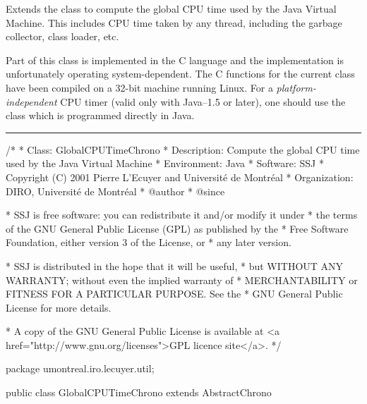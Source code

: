 
Extends the   class to compute the global CPU time used
by the Java Virtual Machine. This includes CPU time taken by any thread,
including the garbage collector, class loader, etc.

Part of this class is implemented in the C language and the 
implementation is unfortunately operating system-dependent.
The C functions for the current class have been compiled on a 32-bit machine
running Linux. %
For a {\em platform-independent} CPU timer (valid only with Java--1.5 or later),
 one should use the class  which is programmed 
directly in Java.

\bigskip\hrule
\begin{code}
\begin{hide}
/*
 * Class:        GlobalCPUTimeChrono
 * Description:  Compute the global CPU time used by the Java Virtual Machine
 * Environment:  Java
 * Software:     SSJ 
 * Copyright (C) 2001  Pierre L'Ecuyer and Université de Montréal
 * Organization: DIRO, Université de Montréal
 * @author       
 * @since

 * SSJ is free software: you can redistribute it and/or modify it under
 * the terms of the GNU General Public License (GPL) as published by the
 * Free Software Foundation, either version 3 of the License, or
 * any later version.

 * SSJ is distributed in the hope that it will be useful,
 * but WITHOUT ANY WARRANTY; without even the implied warranty of
 * MERCHANTABILITY or FITNESS FOR A PARTICULAR PURPOSE.  See the
 * GNU General Public License for more details.

 * A copy of the GNU General Public License is available at
   <a href="http://www.gnu.org/licenses">GPL licence site</a>.
 */
\end{hide}
package umontreal.iro.lecuyer.util;


public class GlobalCPUTimeChrono extends AbstractChrono\begin{hide} {
   
   private static boolean ssjUtilLoaded = false;
   private static native void Heure (long[] tab);

   protected void getTime (long[] tab) {
      if (!ssjUtilLoaded) {
         // We cannot load the library in a static block
         // since the subclass ChronoSingleThread does not
         // need the native method.
         System.loadLibrary ("ssjutil");

         ssjUtilLoaded = true;
      }
      
      Heure (tab);
   }
\end{hide}
\end{code}

